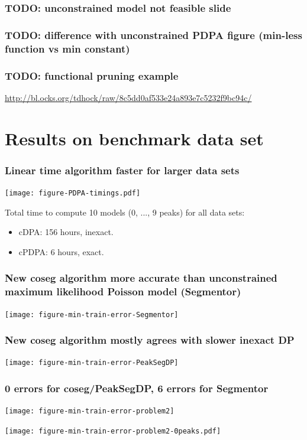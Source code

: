 \documentclass{beamer}
\begin{document}
\begin{frame}
  \frametitle{TODO: unconstrained model not feasible slide}
\end{frame}

\begin{frame}
  \frametitle{TODO: difference with unconstrained PDPA figure
    (min-less function vs min constant)}
\end{frame}

\begin{frame}
  \frametitle{TODO: functional pruning example}
  \url{http://bl.ocks.org/tdhock/raw/8c5dd0af533e24a893e7c5232f9bc94c/}
\end{frame}

\section{Results on benchmark data set}

\begin{frame}
  \frametitle{Linear time algorithm faster for larger data sets}
  \texttt{[image: figure-PDPA-timings.pdf]}

  Total time to compute 10 models (0, ..., 9 peaks) for all data sets:
  \begin{itemize}
  \item cDPA: 156 hours, inexact.
  \item cPDPA: 6 hours, exact.
  \end{itemize}
\end{frame}

\begin{frame}
  \frametitle{New coseg algorithm more accurate than unconstrained
    maximum likelihood Poisson model (Segmentor)}
  \texttt{[image: figure-min-train-error-Segmentor]}
\end{frame}

\begin{frame}
  \frametitle{New coseg algorithm mostly agrees with slower inexact DP}
  \texttt{[image: figure-min-train-error-PeakSegDP]}
\end{frame}

\begin{frame}
  \frametitle{0 errors for coseg/PeakSegDP, 6 errors for Segmentor}
  \texttt{[image: figure-min-train-error-problem2]}
\end{frame}

\begin{frame}
  \texttt{[image: figure-min-train-error-problem2-0peaks.pdf]}
\end{frame}
\end{document}
